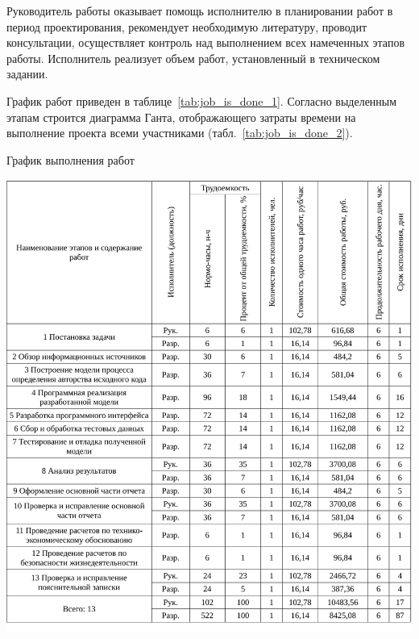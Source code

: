 Руководитель работы оказывает помощь исполнителю в планировании работ в период проектирования, рекомендует
необходимую литературу, проводит консультации, осуществляет контроль над выполнением всех 
намеченных этапов работы. Исполнитель реализует объем работ, установленный в техническом задании.

График работ приведен в таблице~\ref{tab:job_is_done_1}. 
Согласно выделенным этапам строится диаграмма
Ганта, отображающего затраты времени на выполнение проекта всеми
участниками (табл.~\ref{tab:job_is_done_2}).


\begin{table}[!ht]
\caption{График выполнения работ}
\centering
\includegraphics[page=1, width=1\linewidth]{tables/economics/schedule.pdf}
\label{tab:job_is_done_1}
\end{table}


